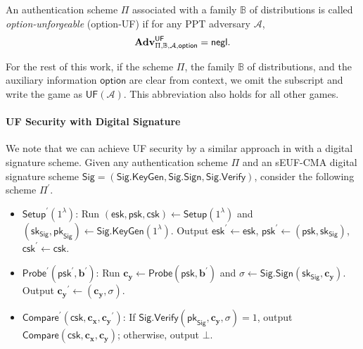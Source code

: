 An authentication scheme $\Pi$ associated with a family $\mathbb{B}$ of distributions is called \emph{\textsf{option}-unforgeable} (\textsf{option}-UF) if for any PPT adversary $\mathcal{A}$,
\[
	\mathbf{Adv}^{\textsf{UF}}_{\Pi, \mathbb{B}, \mathcal{A}, \textsf{option}} = \mathsf{negl}.
\]

For the rest of this work, if the scheme $\Pi$, the family $\mathbb{B}$ of distributions, and the auxiliary information $\textsf{option}$ are clear from context, we omit the subscript and write the game as $\textsf{UF}(\mathcal{A})$. This abbreviation also holds for all other games.


\paragraph{UF Security with Digital Signature}

We note that we can achieve UF security by a similar approach in \cite{cryptoeprint:2023/481} with a digital signature scheme. Given any authentication scheme $\Pi$ and an sEUF-CMA digital signature scheme $\textsf{Sig} = (\textsf{Sig.KeyGen}, \textsf{Sig.Sign}, \textsf{Sig.Verify})$, consider the following scheme $\Pi^\prime$.

\begin{itemize}

	\item $\textsf{Setup}^\prime (1^\lambda)$: Run $(\textsf{esk}, \textsf{psk}, \textsf{csk}) \gets \textsf{Setup}(1^\lambda)$ and $(\textsf{sk}_{\textsf{Sig}}, \textsf{pk}_{\textsf{Sig}}) \gets \textsf{Sig.KeyGen}(1^\lambda)$. Output $\textsf{esk}^\prime \gets \textsf{esk}$, $\textsf{psk}^\prime \gets (\textsf{psk}, \textsf{sk}_{\textsf{Sig}})$, $\textsf{csk}^\prime \gets \textsf{csk}$.

	\item $\textsf{Probe}^\prime (\textsf{psk}^\prime, \mathbf{b}^\prime)$: Run $\mathbf{c_y} \gets \textsf{Probe}(\textsf{psk}, \mathbf{b}^\prime)$ and $\sigma \gets \textsf{Sig.Sign}(\textsf{sk}_{\textsf{Sig}}, \mathbf{c_y})$. Output $\mathbf{c_y}^\prime \gets (\mathbf{c_y}, \sigma)$.

	\item $\textsf{Compare}^\prime (\textsf{csk}, \mathbf{c_x}, \mathbf{c_y}^\prime)$: If $\textsf{Sig.Verify}(\textsf{pk}_{\textsf{Sig}}, \mathbf{c_y}, \sigma) = 1$, output $\textsf{Compare}(\textsf{csk}, \mathbf{c_x}, \mathbf{c_y})$; otherwise, output $\bot$.

\end{itemize}

